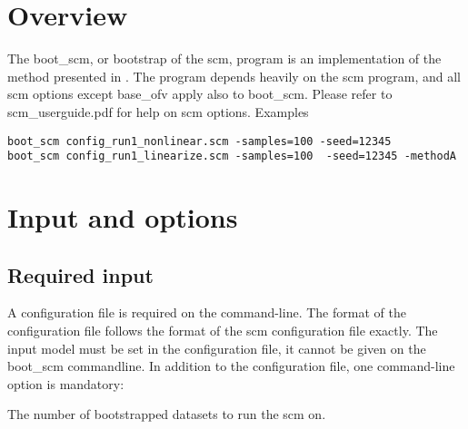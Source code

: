 




\maketitle

\newcommand{\guidetoolname}{boot\_scm}

\section{Overview}

The boot\_scm, or bootstrap of the scm,
program is an implementation of the method presented in \cite{Keizer2}.
The program depends heavily on the scm program, and all scm options except base\_ofv
apply also to boot\_scm. Please refer to scm\_userguide.pdf for help on scm options.
Examples
\begin{verbatim}
boot_scm config_run1_nonlinear.scm -samples=100 -seed=12345
boot_scm config_run1_linearize.scm -samples=100  -seed=12345 -methodA
\end{verbatim}

\section{Input and options}

\subsection{Required input}
A configuration file is required on the command-line. The format of the configuration file follows the format of the scm configuration file exactly. 
The input model must be set in the configuration file, it cannot be given on the boot\_scm commandline. 
In addition to the configuration file, one command-line option is mandatory:
\begin{optionlist}
The number of bootstrapped datasets to run the scm on. 
\nextopt
\end{optionlist}

